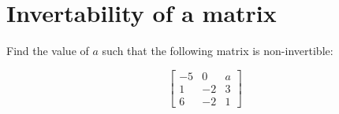 



        
        
        



\section{Invertability of a matrix}
\begin{problem}%
    Find the value of $a$ such that the following matrix is non-invertible:

        \[ \begin{bmatrix}
            -5 & 0 & a \\ 1 & -2 & 3 \\ 6 & -2 & 1 
        \end{bmatrix} \]
\end{problem}

